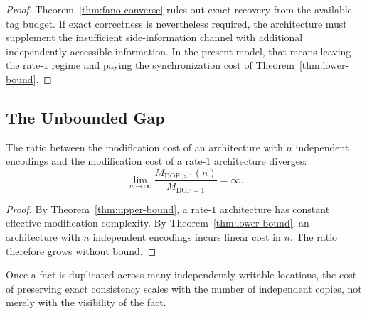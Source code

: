 \begin{proof}
Theorem~\ref{thm:fano-converse} rules out exact recovery from the available tag budget. If exact correctness is nevertheless required, the architecture must supplement the insufficient side-information channel with additional independently accessible information. In the present model, that means leaving the rate-$1$ regime and paying the synchronization cost of Theorem~\ref{thm:lower-bound}.
\end{proof}

\subsection{The Unbounded Gap}\label{sec:gap}

\begin{theorem}\label{thm:unbounded-gap}
The ratio between the modification cost of an architecture with $n$ independent encodings and the modification cost of a rate-$1$ architecture diverges:
\[
\lim_{n\to\infty}\frac{M_{\mathrm{DOF}>1}(n)}{M_{\mathrm{DOF}=1}}=\infty.
\]
\end{theorem}

\begin{proof}
By Theorem~\ref{thm:upper-bound}, a rate-$1$ architecture has constant effective modification complexity. By Theorem~\ref{thm:lower-bound}, an architecture with $n$ independent encodings incurs linear cost in $n$. The ratio therefore grows without bound.
\end{proof}

Once a fact is duplicated across many independently writable locations, the cost of preserving exact consistency scales with the number of independent copies, not merely with the visibility of the fact.
